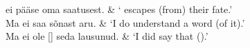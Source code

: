 	\twoFixedColumnsTable
	 ei pääse oma saatusest. 											& ` escapes (from) their fate.' \\
	Ma ei saa  sõnast aru.											& `I do  understand a  word (of it).' \\
	Ma ei ole  [] seda lausunud. 	& `I did  say that  ().'
	\tableEnd

\Vocabulary %

\Exercises %

\Expressions %

\AnswersToExercises %

